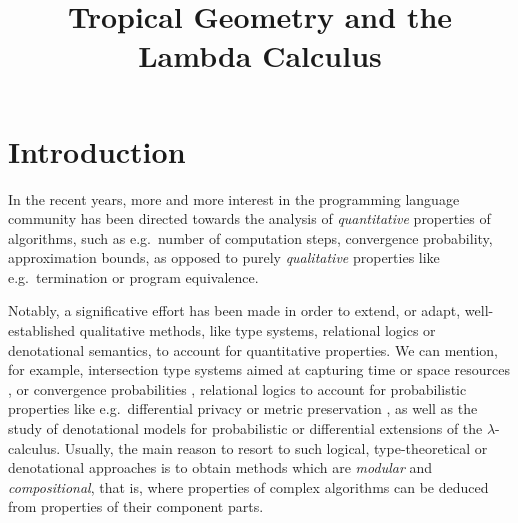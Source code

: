 \documentclass[conference]{IEEEtran}
\begin{document}
\title{Tropical Geometry and the Lambda Calculus}

\author{
\and
{}
}

\maketitle

\begin{abstract}

\end{abstract}

\begin{IEEEkeywords}
\end{IEEEkeywords}

\section{Introduction}

In the recent years, more and more interest in the programming language community has been directed towards the analysis of \emph{quantitative} properties of algorithms, such as e.g.~number of computation steps, convergence probability, 
approximation bounds, 
as opposed to purely \emph{qualitative} properties like e.g.~termination or program equivalence. 

Notably, a significative effort has been made in order to extend, or adapt, well-established qualitative methods, like type systems, relational logics or denotational semantics, to account for quantitative properties. We can mention, for example, 
intersection type systems aimed at capturing time or space resources \cite{Beniamino}, or convergence probabilities \cite{UgoBreuvart, LICS2022},  relational logics to account for probabilistic properties like e.g.~differential privacy \cite{Barthes} or metric preservation \cite{Reed2010, dallago}, as well as the study of denotational models for 
probabilistic \cite{PCOH, QBS} or differential \cite{difflambda} extensions of the $\lambda$-calculus. 
Usually, the main reason to resort to such logical, type-theoretical or denotational approaches is to obtain methods which are \emph{modular} and \emph{compositional}, that is, where properties of complex algorithms can be deduced from properties of their component parts.   
\end{document}
